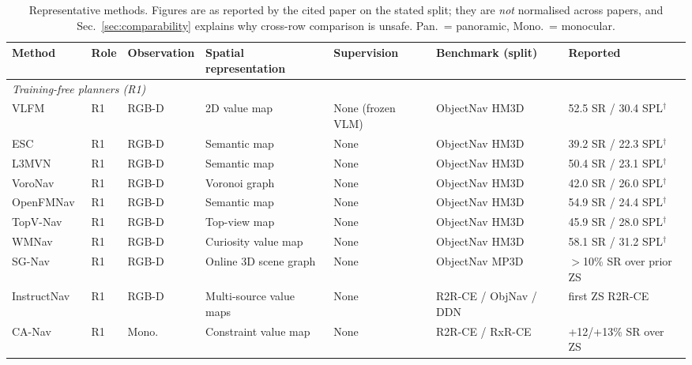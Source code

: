 \documentclass[journal]{IEEEtran}
\begin{document}
\begin{table}[!t]
  \caption{Representative methods. Figures are as reported by the cited
  paper on the stated split; they are \emph{not} normalised across papers,
  and Sec.~\ref{sec:comparability} explains why cross-row comparison is
  unsafe. Pan.\ = panoramic, Mono.\ = monocular.}
  \label{tab:methods}
  \centering
  \setlength{\tabcolsep}{3pt}
  \footnotesize
  \begin{tabular}{lllllll}
    \toprule
    Method & Role & Observation & Spatial representation & Supervision & Benchmark (split) & Reported \\
    \midrule
    \multicolumn{7}{l}{\itshape Training-free planners (R1)} \\
    VLFM~\cite{yokoyama2024vlfm}          & R1 & RGB-D  & 2D value map        & None (frozen VLM)      & ObjectNav HM3D & 52.5 SR / 30.4 SPL$^\dagger$ \\
    ESC~\cite{zhou2023esc}                & R1 & RGB-D  & Semantic map        & None                   & ObjectNav HM3D & 39.2 SR / 22.3 SPL$^\dagger$ \\
    L3MVN~\cite{yu2023l3mvn}              & R1 & RGB-D  & Semantic map        & None                   & ObjectNav HM3D & 50.4 SR / 23.1 SPL$^\dagger$ \\
    VoroNav~\cite{wu2024voronav}          & R1 & RGB-D  & Voronoi graph       & None                   & ObjectNav HM3D & 42.0 SR / 26.0 SPL$^\dagger$ \\
    OpenFMNav~\cite{kuang2024openfmnav}   & R1 & RGB-D  & Semantic map        & None                   & ObjectNav HM3D & 54.9 SR / 24.4 SPL$^\dagger$ \\
    TopV-Nav~\cite{zhong2026topv}         & R1 & RGB-D  & Top-view map        & None                   & ObjectNav HM3D & 45.9 SR / 28.0 SPL$^\dagger$ \\
    WMNav~\cite{nie2025wmnav}             & R1 & RGB-D  & Curiosity value map & None                   & ObjectNav HM3D & 58.1 SR / 31.2 SPL$^\dagger$ \\
    SG-Nav~\cite{yin2024online}           & R1 & RGB-D  & Online 3D scene graph & None                 & ObjectNav MP3D & $>$10\% SR over prior ZS \\
    InstructNav~\cite{long2024instructnav}& R1 & RGB-D  & Multi-source value maps & None & R2R-CE / ObjNav / DDN & first ZS R2R-CE \\
    CA-Nav~\cite{chen2025constraint}      & R1 & Mono.  & Constraint value map & None & R2R-CE / RxR-CE & +12/+13\% SR over ZS \\

\end{tabular}
\end{table}
\end{document}
